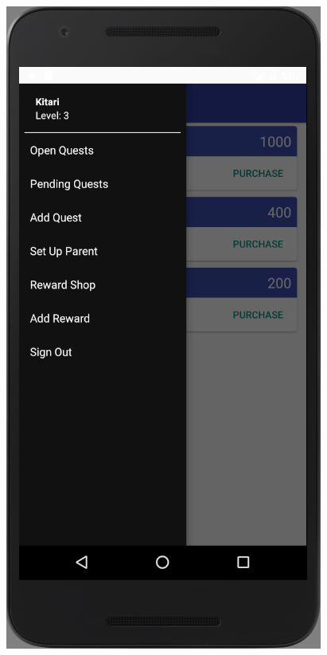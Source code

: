 \begin{figure}[ht]
\begin{minipage}[b]{0.25\linewidth}
    \includegraphics[width=.8\linewidth, frame]{../images/Screenshot/NavigationBar.png}
    \vspace{2ex}
  \end{minipage} 
  \begin{minipage}[b]{0.25\linewidth}
    \centering

\end{minipage}
\end{figure}
